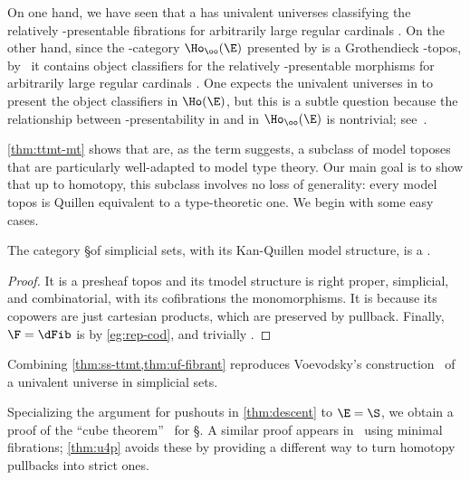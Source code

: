 \begin{rmk}
  On one hand, we have seen that a \ttmt \E has univalent universes classifying the relatively \ka-presentable fibrations for arbitrarily large regular cardinals \ka.
  On the other hand, since the \io-category $\Ho_\oo(\E)$ presented by \E is a Grothendieck \io-topos, by~\cite[Theorem 6.1.6.8]{lurie:higher-topoi} it contains object classifiers for the relatively \ka-presentable morphisms for arbitrarily large regular cardinals \ka.
  One expects the univalent universes in \E to present the object classifiers in $\Ho(\E)$, but this is a subtle question because the relationship between \ka-presentability in \E and in $\Ho_\oo(\E)$ is nontrivial; see~\cite{MO:cptobjio,stenzel:thesis}.
\end{rmk}

\cref{thm:ttmt-mt} shows that \ttmts are, as the term suggests, a subclass of model toposes that are particularly well-adapted to model type theory.
Our main goal is to show that up to homotopy, this subclass involves no loss of generality: every model topos is Quillen equivalent to a type-theoretic one.
We begin with some easy cases.

\begin{prop}\label{thm:ss-ttmt}
  The category \S of simplicial sets, with its Kan-Quillen model structure, is a \ttmt.
\end{prop}
\begin{proof}
  It is a presheaf topos and its tmodel structure is right proper, simplicial, and combinatorial, with its cofibrations the monomorphisms.
  It is \slcc because its copowers are just cartesian products, which are preserved by pullback.
  Finally, $\F=\dFib$ is \local by \cref{eg:rep-cod}, and trivially \stratified.
\end{proof}

Combining \cref{thm:ss-ttmt,thm:uf-fibrant} reproduces Voevodsky's construction~\cite{klv:ssetmodel} of a univalent universe in simplicial sets.

\begin{rmk}
  Specializing the argument for pushouts in \cref{thm:descent} to $\E=\S$, we obtain a proof of the ``cube theorem''~\cite{puppe:cube} for \S.
  A similar proof appears in~\cite[Lemma 6.1.3.12]{lurie:higher-topoi} using minimal fibrations; \cref{thm:u4p} avoids these %
  by providing a different way to turn homotopy pullbacks into strict ones.
\end{rmk}

